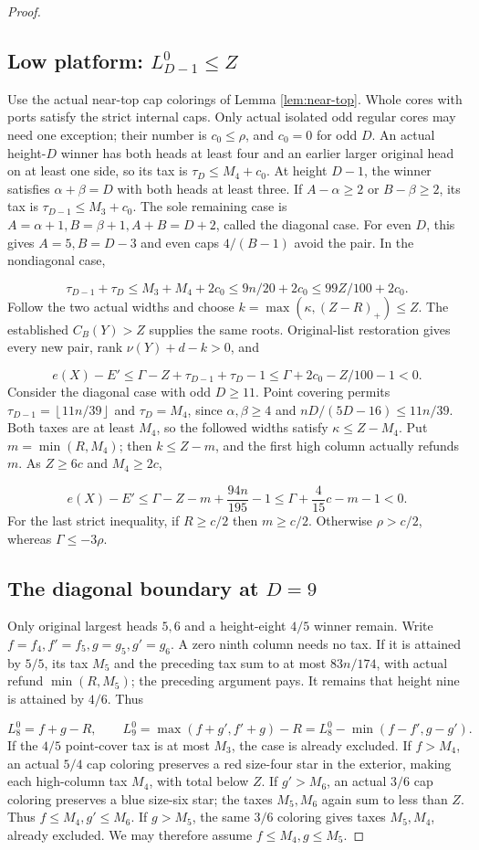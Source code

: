 \documentclass[11pt,a4paper]{article}
\newcommand{\floor}[1]{\left\lfloor#1\right\rfloor}
\theoremstyle{definition}
\begin{document}
\begin{proof}
\subsection*{Low platform: $L_{D-1}^0\le Z$}
Use the actual near-top cap colorings of Lemma \ref{lem:near-top}.
Whole cores with ports satisfy the strict internal caps.
Only actual isolated odd regular cores may need one exception;
their number is $c_0\le\rho$, and $c_0=0$ for odd $D$.
An actual height-$D$ winner has both heads at least four and an earlier
larger original head on at least one side, so its tax is $\tau_D\le M_4+c_0$.
At height $D-1$, the winner satisfies $\alpha+\beta=D$ with both heads at least three.
If $A-\alpha\ge2$ or $B-\beta\ge2$, its tax is $\tau_{D-1}\le M_3+c_0$.
The sole remaining case is
$A=\alpha+1,B=\beta+1,A+B=D+2$, called the diagonal case.
For even $D$, this gives $A=5,B=D-3$ and even caps $4/(B-1)$ avoid the pair.
In the nondiagonal case,

\[
\tau_{D-1}+\tau_D\le M_3+M_4+2c_0
\le9n/20+2c_0\le99Z/100+2c_0.
\]
Follow the two actual widths and choose
$k=\max(\kappa,(Z-R)_+)\le Z$.
The established $C_B(Y)>Z$ supplies the same roots.
Original-list restoration gives every new pair, rank $\nu(Y)+d-k>0$, and

\[
e(X)-E'\le\Gamma-Z+\tau_{D-1}+\tau_D-1
\le\Gamma+2c_0-Z/100-1<0.
\]
Consider the diagonal case with odd $D\ge11$.
Point covering permits
$\tau_{D-1}=\floor{11n/39}$ and $\tau_D=M_4$,
since $\alpha,\beta\ge4$ and $nD/(5D-16)\le11n/39$.
Both taxes are at least $M_4$, so the followed widths satisfy $\kappa\le Z-M_4$.
Put $m=\min(R,M_4)$; then $k\le Z-m$, and the first high column
actually refunds $m$. As $Z\ge6c$ and $M_4\ge2c$,

\[
e(X)-E'\le\Gamma-Z-m+\frac{94n}{195}-1
\le\Gamma+\frac4{15}c-m-1<0.
\]
For the last strict inequality, if $R\ge c/2$ then $m\ge c/2$.
Otherwise $\rho>c/2$, whereas $\Gamma\le-3\rho$.

\subsection*{The diagonal boundary at $D=9$}
Only original largest heads $5,6$ and a height-eight $4/5$ winner remain.
Write $f=f_4,f'=f_5,g=g_5,g'=g_6$.
A zero ninth column needs no tax.
If it is attained by $5/5$, its tax $M_5$ and the preceding tax sum to
at most $83n/174$, with actual refund $\min(R,M_5)$; the preceding argument pays.
It remains that height nine is attained by $4/6$. Thus

\[
L_8^0=f+g-R,\qquad
L_9^0=\max(f+g',f'+g)-R
=L_8^0-\min(f-f',g-g').
\]
If the $4/5$ point-cover tax is at most $M_3$, the case is already excluded.
If $f>M_4$, an actual $5/4$ cap coloring preserves a red size-four star in
the exterior, making each high-column tax $M_4$, with total below $Z$.
If $g'>M_6$, an actual $3/6$ cap coloring preserves a blue size-six star;
the taxes $M_5,M_6$ again sum to less than $Z$.
Thus $f\le M_4,g'\le M_6$.
If $g>M_5$, the same $3/6$ coloring gives taxes $M_5,M_4$, already excluded.
We may therefore assume $f\le M_4,g\le M_5$.


\end{proof}
\end{document}
